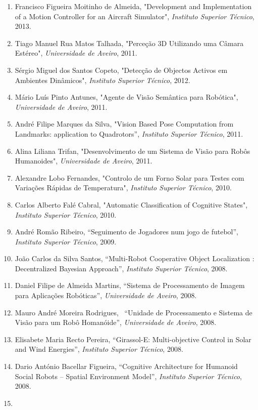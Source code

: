 \begin{enumerate}
\item
  Francisco Figueira Moitinho de Almeida, "Development and
  Implementation of a Motion Controller for an Aircraft Simulator",
  \emph{Instituto Superior Técnico}, 2013.
\item
  Tiago Manuel Rua Matos Talhada, "Perceção 3D Utilizando uma Câmara
  Estéreo", \emph{Universidade de Aveiro}, 2011.
\item
  Sérgio Miguel dos Santos Copeto, "Detecção de Objectos Activos em
  Ambientes Dinâmicos", \emph{Instituto Superior Técnico}, 2012.
\item
  Mário Luís Pinto Antunes, "Agente de Visão Semântica para Robótica",
  \emph{Universidade de Aveiro}, 2011.
\item
  André Filipe Marques da Silva, "Vision Based Pose Computation from
  Landmarks: application to Quadrotors'', \emph{Instituto Superior
  Técnico}, 2011.
\item
  Alina Liliana Trifan, "Desenvolvimento de um Sistema de Visão para
  Robôs Humanoides", \emph{Universidade de Aveiro}, 2011.
\item
  Alexandre Lobo Fernandes, "Controlo de um Forno Solar para Testes com
  Variações Rápidas de Temperatura", \emph{Instituto Superior Técnico},
  2010.
\item
  Carlos Alberto Falé Cabral, "Automatic Classification of Cognitive
  States", \emph{Instituto Superior Técnico}, 2010.
\item
  André Romão Ribeiro, ``Seguimento de Jogadores num jogo de futebol'',
  \emph{Instituto Superior Técnico}, 2009.
\item
  João Carlos da Silva Santos, ``Multi-Robot Cooperative Object
  Localization : Decentralized Bayesian Approach'', \emph{Instituto
  Superior Técnico}, 2008.
\item
  Daniel Filipe de Almeida Martins, ``Sistema de Processamento de Imagem
  para Aplicações Robóticas'', \emph{Universidade de Aveiro}, 2008.
\item
  Mauro André Moreira Rodrigues,~ ``Unidade de Processamento e Sistema
  de Visão para um Robô Homanóide'', \emph{Universidade de Aveiro},
  2008.
\item
  Elisabete Maria Recto Pereira, ``Girassol-E: Multi-objective Control
  in Solar and Wind Energies'', \emph{Instituto Superior Técnico}, 2008.
\item
  Dario António Bacellar Figueira, ``Cognitive Architecture for Humanoid
  Social Robots -- Spatial Environment Model'', \emph{Instituto Superior
  Técnico}, 2008.
\item

\end{enumerate}
